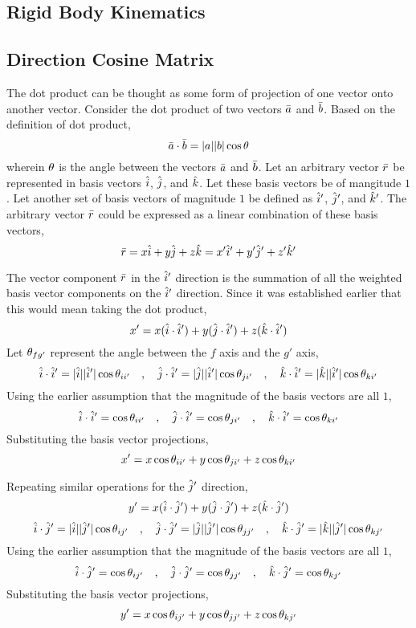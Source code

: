 \documentclass[a4paper, 12pt]{report}
\begin{document}
\begin{center}
\chapter{Rigid Body Kinematics}
\begin{comment}
\end{comment}
\section{Direction Cosine Matrix}
\begin{comment}
\end{comment}
The dot product can be thought as some form of projection of one vector onto another vector. Consider the dot product of two vectors $\bar{a}$ and $\bar{b}$. Based on the definition of dot product,
$$\bar{a}\cdot\bar{b} = |a||b|\cos\theta$$
wherein $\theta$ is the angle between the vectors $\bar{a}$ and $\bar{b}$. Let an arbitrary vector $\bar{r}$ be represented in basis vectors $\hat{i}$, $\hat{j}$, and $\hat{k}$. Let these basis vectors be of mangitude $1$. Let another set of basis vectors of magnitude $1$ be defined as $\hat{i}'$, $\hat{j}'$, and $\hat{k}'$. The arbitrary vector $\bar{r}$ could be expressed as a linear combination of these basis vectors,
$$\bar{r} = x\hat{i} + y\hat{j} + z\hat{k} = x'\hat{i}' + y'\hat{j}' + z'\hat{k}'$$

The vector component $\bar{r}$ in the $\hat{i}'$ direction is the summation of all the weighted basis vector components on the $\hat{i}'$ direction. Since it was established earlier that this would mean taking the dot product,
$$x' = x(\hat{i}\cdot\hat{i}') + y(\hat{j}\cdot\hat{i}') + z(\hat{k}\cdot\hat{i}')$$
Let $\theta_{fg'}$ represent the angle between the $f$ axis and the $g'$ axis,
$$\hat{i}\cdot\hat{i}' = |\hat{i}||\hat{i}'|\cos\theta_{ii'} \quad,\quad \hat{j}\cdot\hat{i}' = |\hat{j}||\hat{i}'|\cos\theta_{ji'} \quad,\quad \hat{k}\cdot\hat{i}' = |\hat{k}||\hat{i}'|\cos\theta_{ki'}$$
Using the earlier assumption that the magnitude of the basis vectors are all $1$,
$$\hat{i}\cdot\hat{i}' = \cos\theta_{ii'} \quad,\quad \hat{j}\cdot\hat{i}' = \cos\theta_{ji'} \quad,\quad \hat{k}\cdot\hat{i}' = \cos\theta_{ki'}$$
Substituting the basis vector projections,
$$x' = x\cos\theta_{ii'} + y\cos\theta_{ji'} + z\cos\theta_{ki'}$$

Repeating similar operations for the $\hat{j}'$ direction,
$$y' = x(\hat{i}\cdot\hat{j}') + y(\hat{j}\cdot\hat{j}') + z(\hat{k}\cdot\hat{j}')$$
$$\hat{i}\cdot\hat{j}' = |\hat{i}||\hat{j}'|\cos\theta_{ij'} \quad,\quad \hat{j}\cdot\hat{j}' = |\hat{j}||\hat{j}'|\cos\theta_{jj'} \quad,\quad \hat{k}\cdot\hat{j}' = |\hat{k}||\hat{j}'|\cos\theta_{kj'}$$
Using the earlier assumption that the magnitude of the basis vectors are all $1$,
$$\hat{i}\cdot\hat{j}' = \cos\theta_{ij'} \quad,\quad \hat{j}\cdot\hat{j}' = \cos\theta_{jj'} \quad,\quad \hat{k}\cdot\hat{j}' = \cos\theta_{kj'}$$
Substituting the basis vector projections,
$$y' = x\cos\theta_{ij'} + y\cos\theta_{jj'} + z\cos\theta_{kj'}$$


\end{center}
\end{document}
